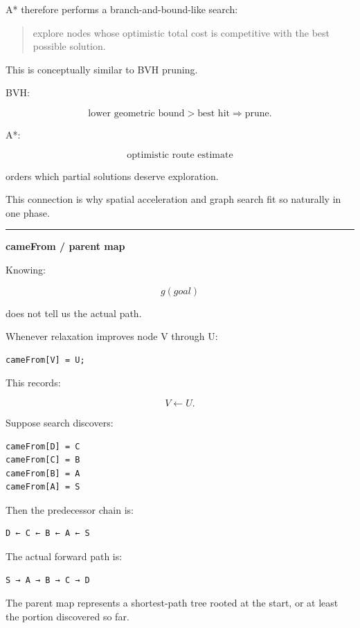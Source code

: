 A* therefore performs a branch-and-bound-like search:

\begin{quote}
explore nodes whose optimistic total cost is competitive with the best possible solution.
\end{quote}

This is conceptually similar to BVH pruning.

BVH:

\[
\text{lower geometric bound}>
\text{best hit}
\Rightarrow
\text{prune}.
\]

A*:

\[
\text{optimistic route estimate}
\]

orders which partial solutions deserve exploration.

This connection is why spatial acceleration and graph search fit so naturally in one phase.

\begin{center}\rule{0.5\linewidth}{0.5pt}\end{center}

\textbf{cameFrom / parent map}

Knowing:

\[
g(goal)
\]

does not tell us the actual path.

Whenever relaxation improves node V through U:

\begin{verbatim}
cameFrom[V] = U;
\end{verbatim}

This records:

\[
V\leftarrow U.
\]

Suppose search discovers:

\begin{verbatim}
cameFrom[D] = C
cameFrom[C] = B
cameFrom[B] = A
cameFrom[A] = S
\end{verbatim}

Then the predecessor chain is:

\begin{verbatim}
D ← C ← B ← A ← S
\end{verbatim}

The actual forward path is:

\begin{verbatim}
S → A → B → C → D
\end{verbatim}

The parent map represents a shortest-path tree rooted at the start, or at least the portion discovered so far.

